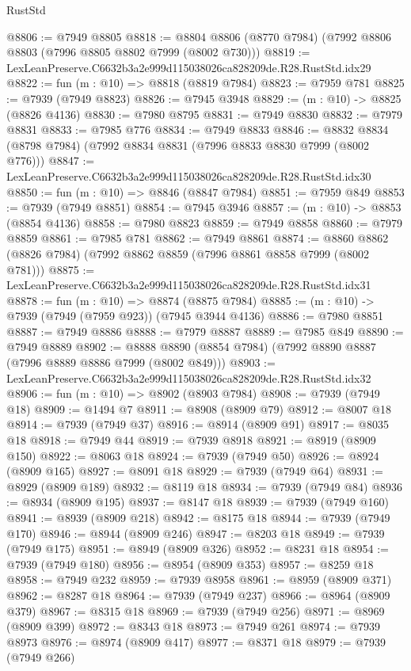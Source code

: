 \begin{lexlean}{RustStd}
\begin{coremodule}
@8806 := @7949 @8805
@8818 := @8804 @8806 (@8770 @7984) (@7992 @8806 @8803 (@7996 @8805 @8802 @7999 (@8002 @730)))
@8819 := LexLeanPreserve.C6632b3a2e999d115038026ca828209de.R28.RustStd.idx29
@8822 := fun (m : @10) => @8818 (@8819 @7984)
@8823 := @7959 @781
@8825 := @7939 (@7949 @8823)
@8826 := @7945 @3948
@8829 := (m : @10) -> @8825 (@8826 @4136)
@8830 := @7980 @8795
@8831 := @7949 @8830
@8832 := @7979 @8831
@8833 := @7985 @776
@8834 := @7949 @8833
@8846 := @8832 @8834 (@8798 @7984) (@7992 @8834 @8831 (@7996 @8833 @8830 @7999 (@8002 @776)))
@8847 := LexLeanPreserve.C6632b3a2e999d115038026ca828209de.R28.RustStd.idx30
@8850 := fun (m : @10) => @8846 (@8847 @7984)
@8851 := @7959 @849
@8853 := @7939 (@7949 @8851)
@8854 := @7945 @3946
@8857 := (m : @10) -> @8853 (@8854 @4136)
@8858 := @7980 @8823
@8859 := @7949 @8858
@8860 := @7979 @8859
@8861 := @7985 @781
@8862 := @7949 @8861
@8874 := @8860 @8862 (@8826 @7984) (@7992 @8862 @8859 (@7996 @8861 @8858 @7999 (@8002 @781)))
@8875 := LexLeanPreserve.C6632b3a2e999d115038026ca828209de.R28.RustStd.idx31
@8878 := fun (m : @10) => @8874 (@8875 @7984)
@8885 := (m : @10) -> @7939 (@7949 (@7959 @923)) (@7945 @3944 @4136)
@8886 := @7980 @8851
@8887 := @7949 @8886
@8888 := @7979 @8887
@8889 := @7985 @849
@8890 := @7949 @8889
@8902 := @8888 @8890 (@8854 @7984) (@7992 @8890 @8887 (@7996 @8889 @8886 @7999 (@8002 @849)))
@8903 := LexLeanPreserve.C6632b3a2e999d115038026ca828209de.R28.RustStd.idx32
@8906 := fun (m : @10) => @8902 (@8903 @7984)
@8908 := @7939 (@7949 @18)
@8909 := @1494 @7
@8911 := @8908 (@8909 @79)
@8912 := @8007 @18
@8914 := @7939 (@7949 @37)
@8916 := @8914 (@8909 @91)
@8917 := @8035 @18
@8918 := @7949 @44
@8919 := @7939 @8918
@8921 := @8919 (@8909 @150)
@8922 := @8063 @18
@8924 := @7939 (@7949 @50)
@8926 := @8924 (@8909 @165)
@8927 := @8091 @18
@8929 := @7939 (@7949 @64)
@8931 := @8929 (@8909 @189)
@8932 := @8119 @18
@8934 := @7939 (@7949 @84)
@8936 := @8934 (@8909 @195)
@8937 := @8147 @18
@8939 := @7939 (@7949 @160)
@8941 := @8939 (@8909 @218)
@8942 := @8175 @18
@8944 := @7939 (@7949 @170)
@8946 := @8944 (@8909 @246)
@8947 := @8203 @18
@8949 := @7939 (@7949 @175)
@8951 := @8949 (@8909 @326)
@8952 := @8231 @18
@8954 := @7939 (@7949 @180)
@8956 := @8954 (@8909 @353)
@8957 := @8259 @18
@8958 := @7949 @232
@8959 := @7939 @8958
@8961 := @8959 (@8909 @371)
@8962 := @8287 @18
@8964 := @7939 (@7949 @237)
@8966 := @8964 (@8909 @379)
@8967 := @8315 @18
@8969 := @7939 (@7949 @256)
@8971 := @8969 (@8909 @399)
@8972 := @8343 @18
@8973 := @7949 @261
@8974 := @7939 @8973
@8976 := @8974 (@8909 @417)
@8977 := @8371 @18
@8979 := @7939 (@7949 @266)

\end{coremodule}
\end{lexlean}
